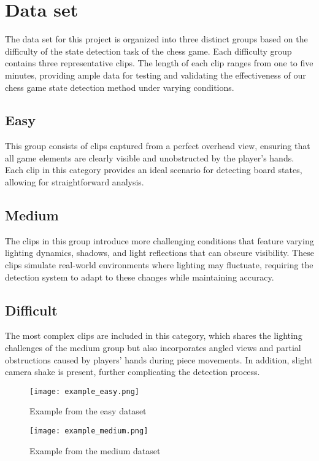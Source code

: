 \documentclass{article}
\begin{document}
\section{Data set}
The data set for this project is organized into three distinct groups based on the difficulty of the state detection task of the chess game. Each difficulty group contains three representative clips. The length of each clip ranges from one to five minutes, providing ample data for testing and validating the effectiveness of our chess game state detection method under varying conditions.

\subsection{Easy}
This group consists of clips captured from a perfect overhead view, ensuring that all game elements are clearly visible and unobstructed by the player's hands. Each clip in this category provides an ideal scenario for detecting board states, allowing for straightforward analysis.

\subsection{Medium}
The clips in this group introduce more challenging conditions that feature varying lighting dynamics, shadows, and light reflections that can obscure visibility. These clips simulate real-world environments where lighting may fluctuate, requiring the detection system to adapt to these changes while maintaining accuracy.

\subsection{Difficult}
The most complex clips are included in this category, which shares the lighting challenges of the medium group but also incorporates angled views and partial obstructions caused by players' hands during piece movements. In addition, slight camera shake is present, further complicating the detection process.

\begin{figure}[!htbp]
    \centering
    \begin{minipage}{.5\textwidth}
        \centering
        \texttt{[image: example\_easy.png]}
        \caption{Example from the easy dataset}
        \label{fig:dprob1_6_2}
    \end{minipage}%
    \begin{minipage}{0.5\textwidth}
        \centering
        \texttt{[image: example\_medium.png]}
        \caption{Example from the medium dataset}
        \label{fig:dprob1_6_1}
    \end{minipage}
\end{figure}
\end{document}
